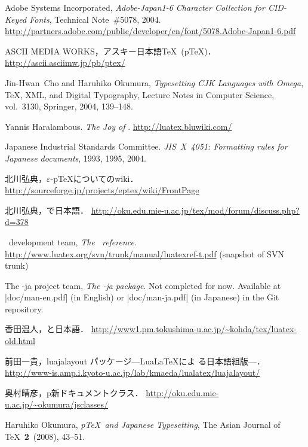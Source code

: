 \documentclass{ajt}
\begin{document}
\providecommand{\bysame}{\leavevmode\hbox to3em{\hrulefill}\thinspace}
\providecommand{\href}[2]{#2}
\begin{thebibliography}{99}

Adobe Systems Incorporated, \emph{Adobe-Japan1-6 Character Collection
	for CID-Keyed Fonts}, Technical Note~\#5078, 2004.
\url{http://partners.adobe.com/public/developer/en/font/5078.Adobe-Japan1-6.pdf}

ASCII MEDIA WORKS，アスキー日本語\TeX\ (p\TeX)．\url{http://ascii.asciimw.jp/pb/ptex/}

Jin-Hwan~Cho and Haruhiko Okumura, \emph{Typesetting CJK Languages with Omega},
\TeX, XML, and Digital Typography, Lecture Notes in Computer Science, vol.~3130,
Springer, 2004, 139--148.

Yannis Haralambous. \emph{The Joy of \LuaTeX}. \url{http://luatex.bluwiki.com/}

Japanese Industrial Standards Committee. \emph{JIS~X~4051: Formatting
	rules for Japanese documents}, 1993, 1995, 2004.

北川弘典，$\varepsilon$-p\TeX についてのwiki．
\url{http://sourceforge.jp/projects/eptex/wiki/FrontPage}

北川弘典，\LuaTeX で日本語．
\url{http://oku.edu.mie-u.ac.jp/tex/mod/forum/discuss.php?d=378}

\LuaTeX\ development team, \emph{The \LuaTeX\ reference}. 
\url{http://www.luatex.org/svn/trunk/manual/luatexref-t.pdf} (snapshot of SVN trunk)

The \LuaTeX-ja project team, \emph{The \LuaTeX-ja package}. 
Not completed for now. Available at |doc/man-en.pdf| (in English) or
	|doc/man-ja.pdf| (in Japanese)
in the Git repository.

香田温人，\LuaTeX と日本語．
\url{http://www1.pm.tokushima-u.ac.jp/~kohda/tex/luatex-old.html}

前田一貴，luajalayout パッケージ---Lua\LaTeX によ
	る日本語組版---．
\url{http://www-is.amp.i.kyoto-u.ac.jp/lab/kmaeda/lualatex/luajalayout/}

奥村晴彦，p\LaTeXe 新ドキュメントクラス．
\url{http://oku.edu.mie-u.ac.jp/~okumura/jsclasses/}

Haruhiko Okumura, \emph{p\TeX\ and Japanese Typesetting},
	The Asian Journal of \TeX\ \textbf{2}~(2008), 43--51.


\end{thebibliography}
\end{document}
